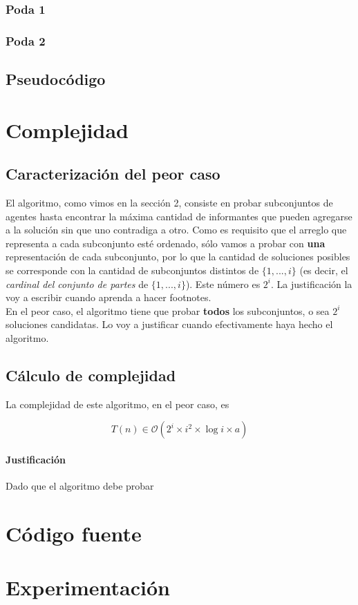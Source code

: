 \documentclass[10pt, a4paper]{article}
\begin{document}
	
	\subsubsection{Poda 1}
	
	\subsubsection{Poda 2}
	
	\subsection{Pseudoc\'odigo}

\section{Complejidad}

	\subsection{Caracterizaci\'on del peor caso}
	El algoritmo, como vimos en la secci\'on 2, consiste en probar subconjuntos de agentes hasta encontrar la m\'axima cantidad de informantes que pueden agregarse a la soluci\'on sin que uno contradiga a otro. Como es requisito que el arreglo que representa a cada subconjunto est\'e ordenado, s\'olo vamos a probar con \textbf{una} representaci\'on de cada subconjunto, por lo que la cantidad de soluciones posibles se corresponde con la cantidad de subconjuntos distintos de $\{1,...,i\}$ (es decir, el \textit{cardinal del conjunto de partes} de $\{1,...,i\}$). Este n\'umero es $2^{i}$. La justificaci\'on la voy a escribir cuando aprenda a hacer footnotes.
	\\
	En el peor caso, el algoritmo tiene que probar \textbf{todos} los subconjuntos, o sea $2^{i}$ soluciones candidatas. Lo voy a justificar cuando efectivamente haya hecho el algoritmo.

	\subsection{C\'alculo de complejidad}
	La complejidad de este algoritmo, en el peor caso, es

	\begin{equation*}	
	T(n) \in \mathcal{O}(2^{i} \times i^{2} \times \log{i} \times a )
	\end{equation*}
	
	\paragraph{Justificaci\'on}
	Dado que el algoritmo debe probar 

\section{C\'odigo fuente}

\section{Experimentaci\'on}
\end{document}
